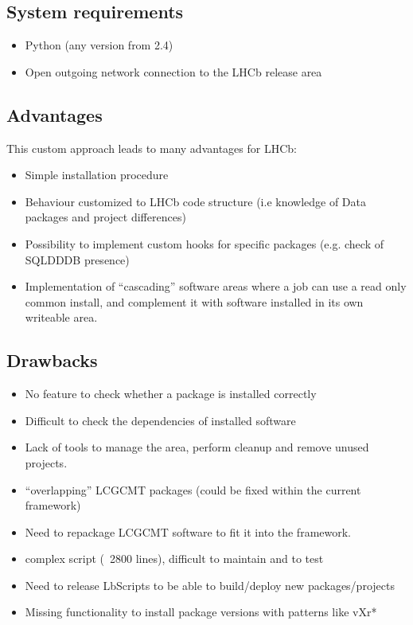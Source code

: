 \documentclass{lhcbnote}
\begin{document}
\subsection{System requirements}
\begin{itemize}
\item Python (any version from 2.4)
\item Open outgoing network connection to the LHCb release area 
\end{itemize}


\subsection{Advantages}
This custom approach leads to many advantages for LHCb:
\begin{itemize}
\item Simple installation procedure
\item Behaviour customized to LHCb code structure (i.e knowledge of Data packages and project differences)
\item Possibility to implement custom hooks for specific packages (e.g. check of SQLDDDB presence)
\item Implementation of ``cascading'' software areas where a job can use a read only common install, and complement it with software installed in its own writeable area.
\end{itemize}

\subsection{Drawbacks}
\begin{itemize}
\item No feature to check whether a package is installed correctly
\item Difficult to check the dependencies of installed software
\item Lack of tools to manage the area, perform cleanup and remove unused projects.
\item ``overlapping'' LCGCMT packages (could be fixed within the current framework) 
\item Need to repackage LCGCMT software to fit it into the framework.
\item complex script (~2800 lines), difficult to maintain and to test
\item Need to release LbScripts to be able to build/deploy new packages/projects
\item Missing functionality to install package versions with patterns like vXr*
\end{itemize}
\end{document}
